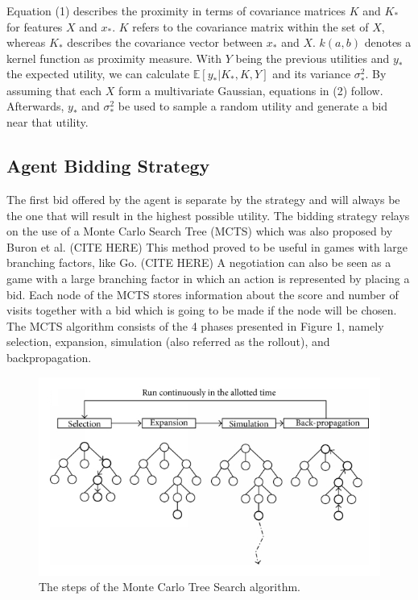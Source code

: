 \documentclass[a4paper,11pt]{article}
\theoremstyle{mytheor}
\begin{document}
Equation (1) describes the proximity in terms of covariance matrices $K$ and $K_*$ for features $X$ and $x_*$. $K$ refers to the covariance matrix within the set of $X$, whereas $K_*$ describes the covariance vector between $x_*$ and $X$. $k(a,b)$ denotes a kernel function as proximity measure. With $Y$ being the previous utilities and $y_*$ the expected utility, we can calculate $\mathbb{E}[y_*|K_*,K,Y]$ and its variance $\sigma_*^2$. By assuming that each $X$ form a multivariate Gaussian, equations in (2) follow. Afterwards, $y_*$ and $\sigma_*^2$ be used to sample a random utility and generate a bid near that utility.

\subsection{Agent Bidding Strategy}
 The first bid offered by the agent is separate by the strategy and will always be the one that will result in the highest possible utility. The bidding strategy relays on the use of a Monte Carlo Search Tree (MCTS) which was also proposed by Buron et al. (CITE HERE) This method proved to be useful in games with large branching factors, like Go. (CITE HERE) A negotiation can also be seen as a game with a large branching factor in which an action is represented by placing a bid. Each node of the MCTS stores information about the score and number of visits together with a bid which is going to be made if the node will be chosen. The MCTS algorithm consists of the 4 phases presented in Figure 1, namely selection, expansion, simulation (also referred as the rollout), and backpropagation. 
\begin{figure}[h!]
  \centering
  \includegraphics[width=0.5\linewidth]{report2/mcts_pic.png}
  \caption{The steps of the Monte Carlo Tree Search algorithm.\cite{MTCS_tree_pic}}
  \label{fig:preferences}
\end{figure}
\end{document}
